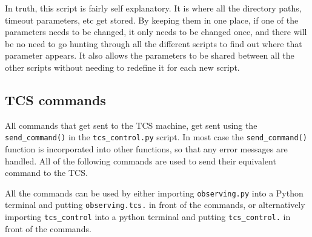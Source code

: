 \documentclass[a4paper,12pt]{article}
\newcommand{\observing}{\tt{observing.py}}
\begin{document}
{In truth, this script is fairly self explanatory. It is where all the directory paths, timeout parameters, etc get stored. By keeping them in one place, if one of the parameters needs to be changed, it only needs to be changed once, and there will be no need to go hunting through all the different scripts to find out where that parameter appears. It also allows the parameters to be shared between all the other scripts without needing to redefine it for each new script.

\subsection{TCS commands}
\label{sec:TCS}

All commands that get sent to the TCS machine, get sent using the {\tt send\_command()} in the {\tt tcs\_control.py} script. In most case the {\tt send\_command()} function is incorporated into other functions, so that any error messages are handled. All of the following commands are used to send their equivalent command to the TCS.

All the commands can be used by either importing {\observing} into a Python terminal and putting {\tt observing.tcs.} in front of the commands, or alternatively importing {\tt tcs\_control} into a python terminal and putting {\tt tcs\_control.} in front of the commands.

}
\end{document}
